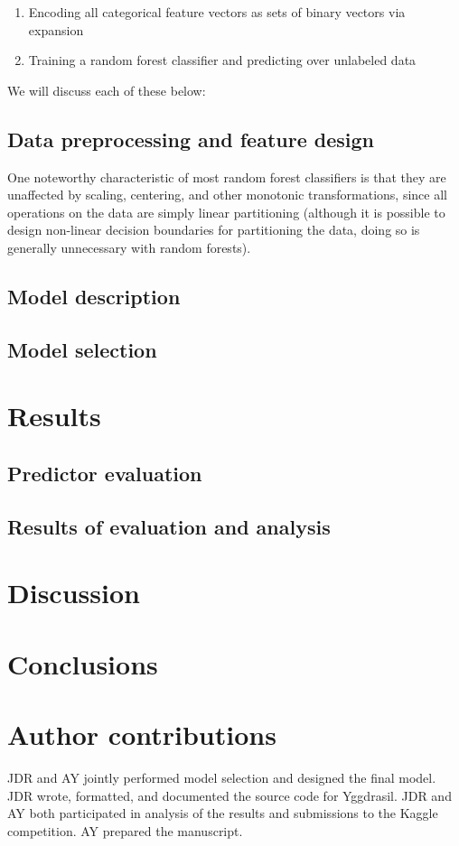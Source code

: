 \documentclass[11pt,a4paper]{article}
\begin{document}
\begin{enumerate}
  \item Encoding all categorical feature vectors as sets of binary vectors via expansion 
  \item Training a random forest classifier and predicting over unlabeled data
\end{enumerate}

We will discuss each of these below:

\subsection{Data preprocessing and feature design}
One noteworthy characteristic of most random forest classifiers is that they are unaffected by scaling, centering, and other monotonic transformations, since all operations on the data are simply linear partitioning (although it is possible to design non-linear decision boundaries for partitioning the data, doing so is generally unnecessary with random forests).

\subsection{Model description}

\subsection{Model selection}
  
\section{Results}

\subsection{Predictor evaluation}

\subsection{Results of evaluation and analysis}

\section{Discussion}

\section{Conclusions}

\section{Author contributions}
JDR and AY jointly performed model selection and designed the final model. JDR wrote, formatted, and documented the source code for Yggdrasil. JDR and AY both participated in analysis of the results and submissions to the Kaggle competition. AY prepared the manuscript.
\end{document}
